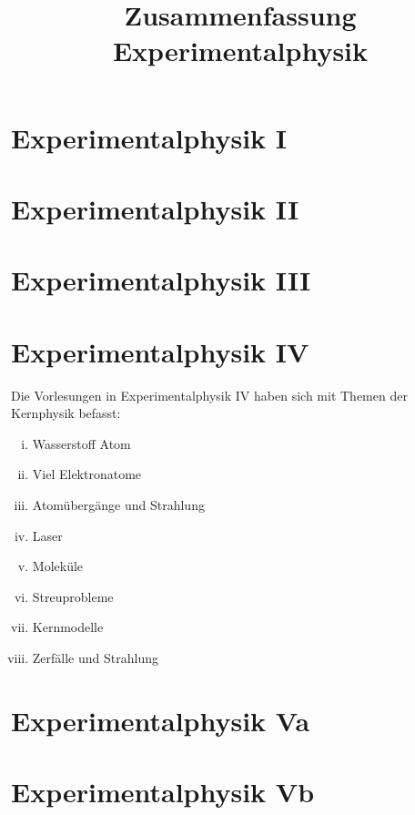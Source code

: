 \documentclass[twocolumn]{summery_4.1}
\title{Zusammenfassung Experimentalphysik}
\begin{document}
\maketitle
\tableofcontents

\section*{Experimentalphysik I}


\section*{Experimentalphysik II}


\section*{Experimentalphysik III}


\section*{Experimentalphysik IV}
Die Vorlesungen in Experimentalphysik IV haben sich mit Themen der Kernphysik befasst:
\begin{enumerate}[(i)]
    \item Wasserstoff Atom
    \item Viel Elektronatome
    \item Atomübergänge und Strahlung
    \item Laser
    \item Moleküle
    \item Streuprobleme
    \item Kernmodelle
    \item Zerfälle und Strahlung
\end{enumerate}

\section*{Experimentalphysik Va}
\section*{Experimentalphysik Vb}
\end{document}
